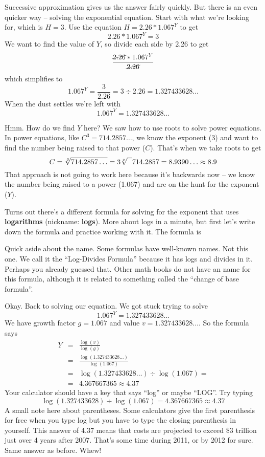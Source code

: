 Successive approximation gives us the answer fairly quickly.  But there is an even quicker way -- solving the exponential equation.  Start with what we're looking for, which is $H= 3$.  Use the equation $H=2.26\ast1.067^Y$ to get $$2.26\ast1.067^Y=3$$ We want to find the value of $Y$, so divide each side by 2.26 to get 
$$\frac{\cancel{2.26}\ast1.067^Y}{\cancel{2.26}}$$ 
which simplifies to 
$$1.067^Y=\frac{3}{2.26}=3 \div 2.26 = 1.327433628\ldots$$  
When the dust settles we're left with $$1.067^Y = 1.327433628\ldots$$ 

Hmm.  How do we find $Y$ here? We saw how to use roots to solve power equations.  In power equations, like $C^3 = 714.2857\ldots$, we know the exponent (3) and want to find the number being raised to that power ($C$).  That's when we take roots to get 
$$C = \sqrt[3]{714.2857\ldots} =3 \sqrt[x]{\text{\raisebox{.6em}{~\text{  }}}} 714.2857 = 8.9390\ldots \approx 8.9$$
That approach is not going to work here because it's backwards now -- we know the number being raised to a power (1.067) and are on the hunt for the exponent ($Y$).  

Turns out there's a different formula for solving for the exponent that uses  \textbf{logarithms} (nickname: \textbf{logs}). More about logs in a minute, but first let's write down the formula and practice working with it.  The formula is 

 \bigskip
\bigskip

\noindent
Quick aside about the name.  Some formulas have well-known names. Not this one.  We call it the ``Log-Divides Formula'' because it has logs and divides in it.  Perhaps you already guessed that.  Other math books do not have an name for this formula, although it is related to something called the ``change of base formula''.  

Okay.  Back to solving our equation. We got stuck trying to solve $$1.067^Y = 1.327433628\ldots$$ 
We have growth factor $g = 1.067$ and value $v=1.327433628\ldots$.
So the formula says  \begin{eqnarray*}
Y & = &  \frac{\log (v)}{\log(g)}\\
& = &  \frac{\log (1.327433628\ldots)}{\log(1.067)}\\
& =  &  \log (1.327433628\ldots) \div \log (1.067) = \\
& =  &  4.367667365 \approx  4.37 
\end{eqnarray*}
Your calculator should have a key that says ``log'' or maybe ``LOG''.  Try typing $$\log( 1.327433628) \div \log (1.067) = 4.367667365 \approx 4.37$$
A small note here about parentheses.  Some calculators give the first parenthesis for free when you type log but you have to type the closing parenthesis in yourself.  This answer of 4.37 means that costs are projected to exceed \$3 trillion just over 4 years after 2007.  That's some time during 2011, or by 2012 for sure.  Same answer as before. Whew!

